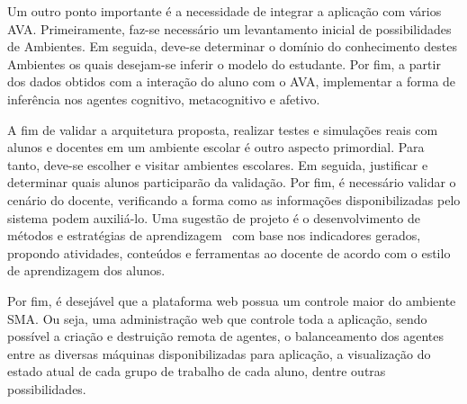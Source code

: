 Um outro ponto importante é a necessidade de integrar a aplicação com vários AVA. Primeiramente, faz-se necessário um levantamento inicial de possibilidades de Ambientes. Em seguida, deve-se determinar o domínio do conhecimento destes Ambientes os quais desejam-se inferir o modelo do estudante. Por fim, a partir dos dados obtidos com a interação do aluno com o AVA, implementar a forma de inferência nos agentes cognitivo, metacognitivo e afetivo.

A fim de validar a arquitetura proposta, realizar testes e simulações reais com alunos e docentes em um ambiente escolar é outro aspecto primordial. Para tanto, deve-se escolher e visitar ambientes escolares. Em seguida, justificar e determinar quais alunos participarão da validação. Por fim, é necessário validar o cenário do docente, verificando a forma como as informações disponibilizadas pelo sistema podem auxiliá-lo. Uma sugestão de projeto é o desenvolvimento de métodos e estratégias de aprendizagem~\cite{muhlbeier12} com base nos indicadores gerados, propondo atividades, conteúdos e ferramentas ao docente de acordo com o estilo de aprendizagem dos alunos.

Por fim, é desejável que a plataforma web possua um controle maior do ambiente SMA. Ou seja, uma administração web que controle toda a aplicação, sendo possível a criação e destruição remota de agentes, o balanceamento dos agentes entre as diversas máquinas disponibilizadas para aplicação, a visualização do estado atual de cada grupo de trabalho de cada aluno, dentre outras possibilidades.
